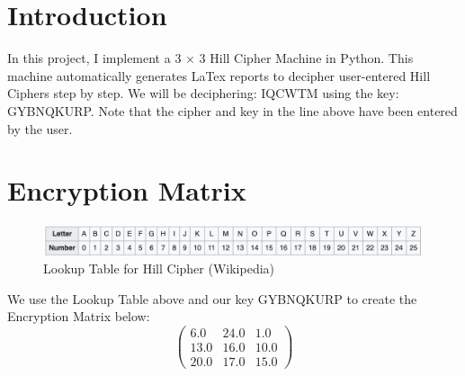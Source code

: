 \documentclass{article}%
\begin{document}
%
\normalsize%
\section{Introduction}%
\label{sec:Introduction}%
In this project, I implement a 3  ×  3 Hill Cipher Machine in Python. This machine automatically generates LaTex reports to decipher user{-}entered Hill Ciphers step by step. \newline%
 \newline%
%
We will be deciphering: IQCWTM using the key: GYBNQKURP. \newline%
 \newline%
%
Note that the cipher and key in the line above have been entered by the user.

%
\section{Encryption Matrix}%
\label{sec:EncryptionMatrix}%


\begin{figure}[h!]%
\centering%
\includegraphics[width=420px]{./LookupHill.png}%
\caption{Lookup Table for Hill Cipher (Wikipedia)}%
\end{figure}

%
We use the Lookup Table above and our key GYBNQKURP to create the Encryption Matrix below: \newline%
%
\[%
\begin{pmatrix}%
6.0&24.0&1.0\\%
13.0&16.0&10.0\\%
20.0&17.0&15.0%
\end{pmatrix}%
\]

%
\end{document}
